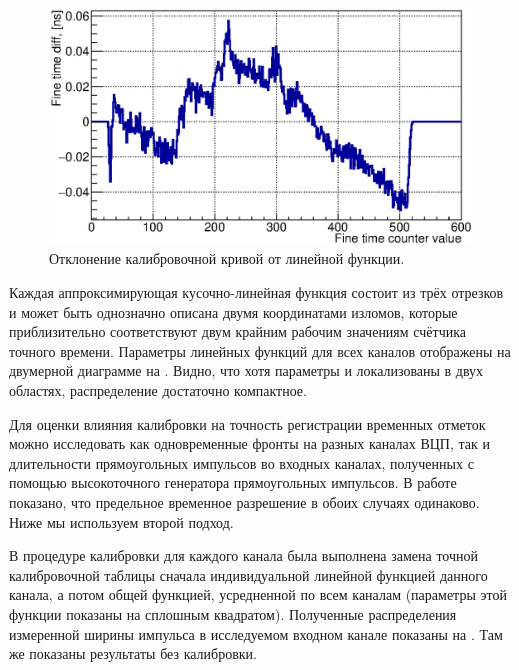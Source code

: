 \begin{figure}[H]
\centering
\includegraphics[width=1.0\textwidth]{pictures/18_CalTableMinusFit_0010_01_feb2017.eps}
\caption{Отклонение калибровочной кривой от линейной функции.}
\label{fig:CalibTableMinusFit}
\end{figure}

Каждая аппроксимирующая кусочно-линейная функция состоит из трёх отрезков и может быть однозначно описана двумя координатами изломов, которые приблизительно соответствуют двум крайним рабочим значениям счётчика точного времени. Параметры линейных функций для всех каналов отображены на двумерной диаграмме на . Видно, что хотя параметры и локализованы в двух областях, распределение достаточно компактное.

Для оценки влияния калибровки на точность регистрации временных отметок можно исследовать как одновременные фронты на разных каналах ВЦП, так и длительности прямоугольных импульсов во входных каналах, полученных с помощью высокоточного генератора прямоугольных импульсов. В работе~\cite{PEPAN} показано, что предельное временное разрешение в обоих случаях одинаково. Ниже мы используем второй подход.

В процедуре калибровки для каждого канала была выполнена замена точной калибровочной таблицы сначала индивидуальной линейной функцией данного канала, а потом общей функцией, усредненной по всем каналам (параметры этой функции показаны на  сплошным квадратом). Полученные распределения измеренной ширины импульса в исследуемом входном канале показаны на . Там же показаны результаты без калибровки.

